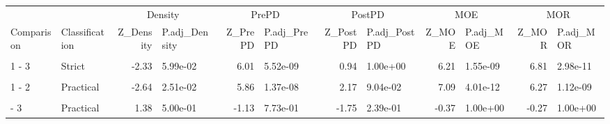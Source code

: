 \begin{table}[!h]
\centering
\begin{tabular}[t]{llrlrlrlrlrl}
\toprule
\multicolumn{2}{c}{ } & \multicolumn{2}{c}{Density} & \multicolumn{2}{c}{PrePD} & \multicolumn{2}{c}{PostPD} & \multicolumn{2}{c}{MOE} & \multicolumn{2}{c}{MOR} \\
\cmidrule(l{3pt}r{3pt}){3-4} \cmidrule(l{3pt}r{3pt}){5-6} \cmidrule(l{3pt}r{3pt}){7-8} \cmidrule(l{3pt}r{3pt}){9-10} \cmidrule(l{3pt}r{3pt}){11-12}
Comparison & Classification & Z\_Density & P.adj\_Density & Z\_PrePD & P.adj\_PrePD & Z\_PostPD & P.adj\_PostPD & Z\_MOE & P.adj\_MOE & Z\_MOR & P.adj\_MOR\\
\midrule
\cellcolor{gray!10}{1 - 2} & \cellcolor{gray!10}{Strict} & \cellcolor{gray!10}{0.14} & \cellcolor{gray!10}{1.00e+00} & \cellcolor{gray!10}{3.14} & \cellcolor{gray!10}{5.07e-03} & \cellcolor{gray!10}{-0.59} & \cellcolor{gray!10}{1.00e+00} & \cellcolor{gray!10}{2.54} & \cellcolor{gray!10}{3.30e-02} & \cellcolor{gray!10}{3.68} & \cellcolor{gray!10}{6.97e-04}\\
1 - 3 & Strict & -2.33 & 5.99e-02 & 6.01 & 5.52e-09 & 0.94 & 1.00e+00 & 6.21 & 1.55e-09 & 6.81 & 2.98e-11\\
\cellcolor{gray!10}{2 - 3} & \cellcolor{gray!10}{Strict} & \cellcolor{gray!10}{-2.36} & \cellcolor{gray!10}{5.42e-02} & \cellcolor{gray!10}{2.64} & \cellcolor{gray!10}{2.48e-02} & \cellcolor{gray!10}{1.48} & \cellcolor{gray!10}{4.17e-01} & \cellcolor{gray!10}{3.42} & \cellcolor{gray!10}{1.86e-03} & \cellcolor{gray!10}{2.87} & \cellcolor{gray!10}{1.25e-02}\\
1 - 2 & Practical & -2.64 & 2.51e-02 & 5.86 & 1.37e-08 & 2.17 & 9.04e-02 & 7.09 & 4.01e-12 & 6.27 & 1.12e-09\\
\cellcolor{gray!10}{1 - 3} & \cellcolor{gray!10}{Practical} & \cellcolor{gray!10}{0.13} & \cellcolor{gray!10}{1.00e+00} & \cellcolor{gray!10}{1.66} & \cellcolor{gray!10}{2.92e-01} & \cellcolor{gray!10}{-0.72} & \cellcolor{gray!10}{1.00e+00} & \cellcolor{gray!10}{3.00} & \cellcolor{gray!10}{8.03e-03} & \cellcolor{gray!10}{2.71} & \cellcolor{gray!10}{2.00e-02}\\
\addlinespace
2 - 3 & Practical & 1.38 & 5.00e-01 & -1.13 & 7.73e-01 & -1.75 & 2.39e-01 & -0.37 & 1.00e+00 & -0.27 & 1.00e+00\\
\bottomrule
\end{tabular}
\end{table}